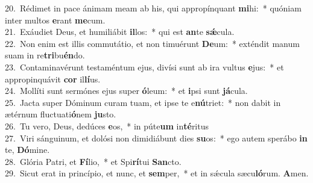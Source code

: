 {20.~}Rédimet in pace ánimam meam ab his, qui appropínquant \textbf{mi}hi:~* quóniam inter multos \textbf{e}rant \textbf{me}cum.\\
{21.~}Exáudiet Deus, et humiliábit \textbf{il}los:~* qui est \textbf{an}te \textbf{sǽ}cula.\\
{22.~}Non enim est illis commutátio, et non timuérunt \textbf{De}um:~* exténdit manum suam in re\textbf{tri}bu\textbf{én}do.\\
{23.~}Contaminavérunt testaméntum ejus, divísi sunt ab ira vultus \textbf{e}jus:~* et appropinquávit \textbf{cor} il\textbf{lí}us.\\
{24.~}Mollíti sunt sermónes ejus super \textbf{ó}leum:~* et \textbf{i}psi sunt \textbf{já}cula.\\
{25.~}Jacta super Dóminum curam tuam, et ipse te e\textbf{nú}triet:~* non dabit in ætérnum fluctuati\textbf{ó}nem \textbf{ju}sto.\\
{26.~}Tu vero, Deus, dedúces \textbf{e}os,~* in púte\textbf{um} in\textbf{té}ritus\\
{27.~}Viri sánguinum, et dolósi non dimidiábunt dies \textbf{su}os:~* ego autem sperábo \textbf{in} te, \textbf{Dó}mine.\\
{28.~}Glória Patri, et \textbf{Fí}lio,~* et Spi\textbf{rí}tui \textbf{San}cto.\\
{29.~}Sicut erat in princípio, et nunc, et \textbf{sem}per,~* et in sǽcula sæcu\textbf{ló}rum. \textbf{A}men.\\

